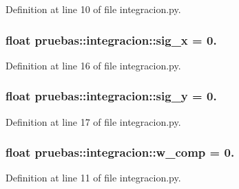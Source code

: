 \-Definition at line 10 of file integracion.\-py.

\subsubsection[{sig\-\_\-x}]{\setlength{\rightskip}{0pt plus 5cm}float {\bf pruebas\-::integracion\-::sig\-\_\-x} = 0.}\label{namespacepruebas_1_1integracion_a1524cb414daa1812d96bbd1c4399f45d}


\-Definition at line 16 of file integracion.\-py.

\subsubsection[{sig\-\_\-y}]{\setlength{\rightskip}{0pt plus 5cm}float {\bf pruebas\-::integracion\-::sig\-\_\-y} = 0.}\label{namespacepruebas_1_1integracion_a903c337bb731fe5e8c316053ef762155}


\-Definition at line 17 of file integracion.\-py.

\subsubsection[{w\-\_\-comp}]{\setlength{\rightskip}{0pt plus 5cm}float {\bf pruebas\-::integracion\-::w\-\_\-comp} = 0.}\label{namespacepruebas_1_1integracion_ae121a7c10f227e15e0811eaa8b7f70f8}


\-Definition at line 11 of file integracion.\-py.

